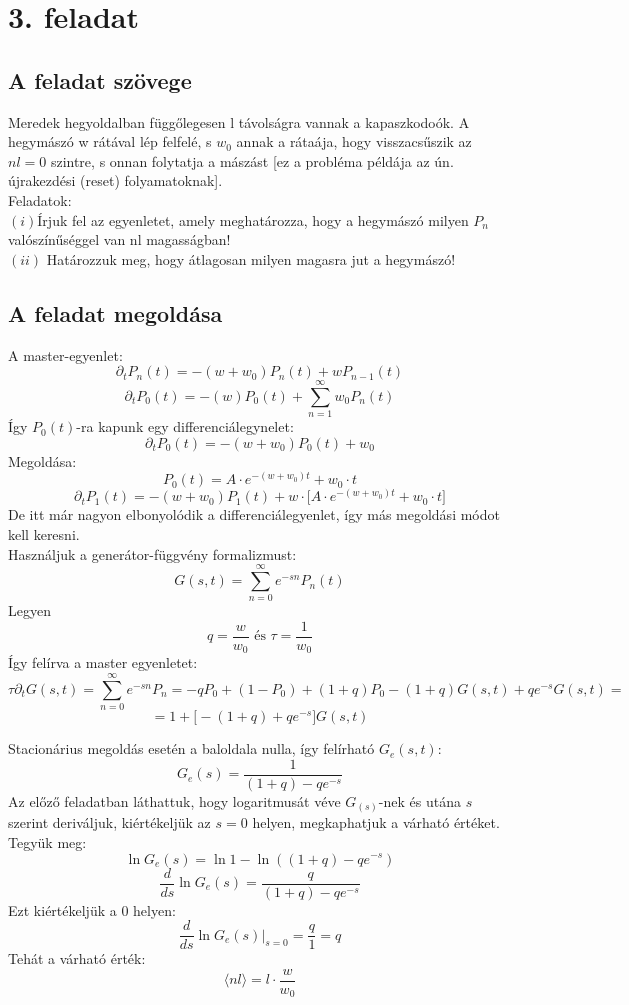 \documentclass[12pt]{article}
\begin{document}
\newpage
\section*{3. feladat}
\subsection*{A feladat szövege}
Meredek hegyoldalban függőlegesen l távolságra vannak a kapaszkodoók. A hegymászó w rátával lép felfelé, s $w_0$ annak a rátaája, hogy visszacsűszik az $nl = 0$ szintre, s onnan folytatja a mászást [ez a probléma példája az ún. újrakezdési (reset) folyamatoknak].
\\Feladatok:\\
$(i)$Írjuk fel az egyenletet, amely meghatározza, hogy a hegymászó milyen $P_n$ valószínűséggel van nl magasságban!\\
$(ii)$ Határozzuk meg, hogy átlagosan milyen magasra jut a hegymászó!
\subsection*{A feladat megoldása}
A master-egyenlet:
$$ \partial_tP_n(t) = -(w+w_0)P_n(t) + wP_{n-1}(t) $$
$$\partial_tP_0(t ) = -(w)P_0(t) + \sum^\infty_{n = 1}w_0P_n(t)$$
Így $P_0(t)$-ra kapunk egy differenciálegynelet:
$$\partial_tP_0(t) = -(w+w_0)P_0(t) + w_0$$
Megoldása:
$$P_0(t) = A\cdot e^{-(w+w_0)t} + w_0\cdot t$$
$$\partial_t P_1(t) =-(w+w_0)P_{1}(t) +w\cdot \Big[A\cdot e^{-(w+w_0)t} + w_0\cdot t\Big ] $$
De itt már nagyon elbonyolódik a differenciálegyenlet, így más megoldási módot kell keresni. \\
Használjuk a generátor-függvény formalizmust:
$$G(s,t) = \sum^\infty_{n=0}e^{-sn}P_{n}(t)$$
Legyen 
$$q = \frac{w}{w_0}\text{ és }\tau = \frac{1}{w_0}$$
Így felírva a master egyenletet:
$$\tau\partial_t G(s, t) = \sum^\infty_{n=0}e^{-sn}P_n= -qP_0+(1-P_0)+(1+q)P_0 -(1+q)G(s,t) +qe^{-s}G(s, t) = $$
$$=1+\Big [-(1+q)+ qe^{-s}\Big ]G(s, t)$$





Stacionárius megoldás esetén a baloldala nulla, így felírható $G_e(s, t)$:
$$G_e(s) = \frac{1}{(1+q)- qe^{-s}}$$
Az előző feladatban láthattuk, hogy logaritmusát véve $G_(s)$-nek és utána $s$ szerint deriváljuk, kiértékeljük az $s =0$ helyen,  megkaphatjuk a várható értéket.
Tegyük meg:
$$\ln{G_e(s)} = \ln{1}- \ln{((1+q)- qe^{-s})}$$
$$\frac{d}{ds}\ln{G_e(s)}= \frac{q}{(1+q)-qe^{-s}}$$
Ezt kiértékeljük a 0 helyen:
$$\frac{d}{ds}\ln{G_e(s)}\Big |_{s=0} = \frac{q}{1} =q$$
Tehát a várható érték:
$$\langle nl\rangle = l\cdot\frac{w}{w_0}$$
\end{document}
